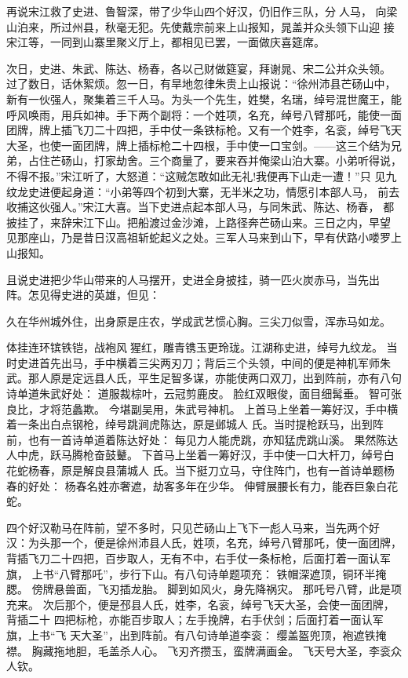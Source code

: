 再说宋江救了史进、鲁智深，带了少华山四个好汉，仍旧作三队，分人马，
向梁山泊来，所过州县，秋毫无犯。先使戴宗前来上山报知，晁盖并众头领下山迎
接宋江等，一同到山寨里聚义厅上，都相见已罢，一面做庆喜筵席。

次日，史进、朱武、陈达、杨春，各以己财做筵宴，拜谢晁、宋二公并众头领。
过了数日，话休絮烦。忽一日，有旱地忽律朱贵上山报说：“徐州沛县芒砀山中，
新有一伙强人，聚集着三千人马。为头一个先生，姓樊，名瑞，绰号混世魔王，能
呼风唤雨，用兵如神。手下两个副将：一个姓项，名充，绰号八臂那吒，能使一面
团牌，牌上插飞刀二十四把，手中仗一条铁标枪。又有一个姓李，名衮，绰号飞天
大圣，也使一面团牌，牌上插标枪二十四根，手中使一口宝剑。——这三个结为兄
弟，占住芒砀山，打家劫舍。三个商量了，要来吞并俺梁山泊大寨。小弟听得说，
不得不报。”宋江听了，大怒道：“这贼怎敢如此无礼!我便再下山走一遭！”只
见九纹龙史进便起身道：“小弟等四个初到大寨，无半米之功，情愿引本部人马，
前去收捕这伙强人。”宋江大喜。当下史进点起本部人马，与同朱武、陈达、杨春，
都披挂了，来辞宋江下山。把船渡过金沙滩，上路径奔芒砀山来。三日之内，早望
见那座山，乃是昔日汉高祖斩蛇起义之处。三军人马来到山下，早有伏路小喽罗上
山报知。

且说史进把少华山带来的人马摆开，史进全身披挂，骑一匹火炭赤马，当先出
阵。怎见得史进的英雄，但见：

久在华州城外住，出身原是庄农，学成武艺惯心胸。三尖刀似雪，浑赤马如龙。

体挂连环镔铁铠，战袍风猩红，雕青镌玉更玲珑。江湖称史进，绰号九纹龙。
当时史进首先出马，手中横着三尖两刃刀；背后三个头领，中间的便是神机军师朱
武。那人原是定远县人氏，平生足智多谋，亦能使两口双刀，出到阵前，亦有八句
诗单道朱武好处：
道服裁棕叶，云冠剪鹿皮。
脸红双眼俊，面目细髯垂。
智可张良比，才将范蠡欺。
今堪副吴用，朱武号神机。
上首马上坐着一筹好汉，手中横着一条出白点钢枪，绰号跳涧虎陈达，原是邺城人
氏。当时提枪跃马，出到阵前，也有一首诗单道着陈达好处：
每见力人能虎跳，亦知猛虎跳山溪。
果然陈达人中虎，跃马腾枪奋鼓鼙。
下首马上坐着一筹好汉，手中使一口大杆刀，绰号白花蛇杨春，原是解良县蒲城人
氏。当下挺刀立马，守住阵门，也有一首诗单题杨春的好处：
杨春名姓亦奢遮，劫客多年在少华。
伸臂展腰长有力，能吞巨象白花蛇。

四个好汉勒马在阵前，望不多时，只见芒砀山上飞下一彪人马来，当先两个好
汉：为头那一个，便是徐州沛县人氏，姓项，名充，绰号八臂那吒，使一面团牌，
背插飞刀二十四把，百步取人，无有不中，右手仗一条标枪，后面打着一面认军旗，
上书“八臂那吒”，步行下山。有八句诗单题项充：
铁帽深遮顶，铜环半掩腮。
傍牌悬兽面，飞刃插龙胎。
脚到如风火，身先降祸灾。
那吒号八臂，此是项充来。
次后那个，便是邳县人氏，姓李，名衮，绰号飞天大圣，会使一面团牌，背插二十
四把标枪，亦能百步取人；左手挽牌，右手伏剑；后面打着一面认军旗，上书“飞
天大圣”，出到阵前。有八句诗单道李衮：
缨盖盔兜顶，袍遮铁掩襟。
胸藏拖地胆，毛盖杀人心。
飞刃齐攒玉，蛮牌满画金。
飞天号大圣，李衮众人钦。

